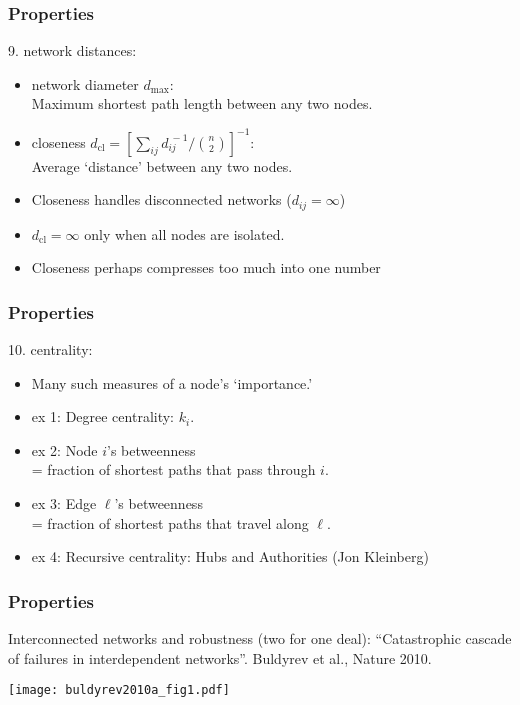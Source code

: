 \begin{frame}
  \frametitle{Properties}

  \begin{block}{9. network distances:}
    \begin{itemize}
    \item<1->
      \alert{network diameter $d_{\textrm{max}}$:}\\
      Maximum shortest path length between any two nodes.
    \item<2->
      \alert{closeness $d_{\textrm{cl}} = [\sum_{ij} d_{ij}^{\ -1} / \binom{n}{2}]^{-1}$:}\\
      Average `distance' between any two nodes.
    \item<3->
      Closeness handles disconnected networks ($d_{ij}=\infty$)
    \item<4->
      $d_{\textrm{cl}} = \infty$ only when all nodes are isolated.
    \item<4->
      Closeness perhaps compresses too much into one number
    \end{itemize}
  \end{block}

\end{frame}

\begin{frame}
  \frametitle{Properties}

  \begin{block}{10. centrality:}
    \begin{itemize}
    \item<2-> Many such measures of a node's `importance.'  
    \item<3-> \alert{ex 1:} Degree centrality: $k_i$.
    \item<4-> \alert{ex 2:} Node $i$'s betweenness \\
      = fraction of shortest paths that pass through $i$.
    \item<5-> \alert{ex 3:} Edge $\ell$'s betweenness \\
      = fraction of shortest paths that travel along $\ell$.
    \item<6-> \alert{ex 4:} Recursive centrality: Hubs and Authorities
      (Jon Kleinberg\cite{kleinberg1998a})
    \end{itemize}
    
  \end{block}

\end{frame}


\begin{frame}
  \frametitle{Properties}

  \begin{block}{Interconnected networks and robustness (two for one deal):}
    ``Catastrophic cascade of failures in interdependent networks''\cite{buldyrev2010a}.
    Buldyrev et al., Nature 2010.
    
    \texttt{[image: buldyrev2010a\_fig1.pdf]}
  \end{block}

\end{frame}



